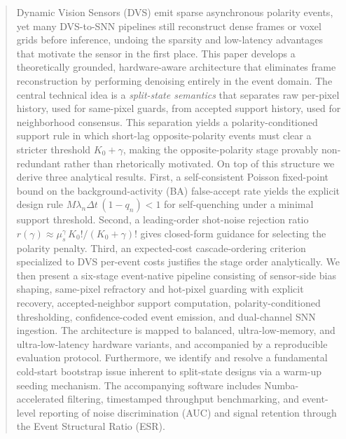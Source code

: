 \documentclass[a4paper,fleqn]{cas-dc}
\begin{document}
\begin{abstract}
Dynamic Vision Sensors (DVS) emit sparse asynchronous polarity events, yet many DVS-to-SNN pipelines still reconstruct dense frames or voxel grids before inference, undoing the sparsity and low-latency advantages that motivate the sensor in the first place. This paper develops a theoretically grounded, hardware-aware architecture that eliminates frame reconstruction by performing denoising entirely in the event domain. The central technical idea is a \emph{split-state semantics} that separates raw per-pixel history, used for same-pixel guards, from accepted support history, used for neighborhood consensus. This separation yields a polarity-conditioned support rule in which short-lag opposite-polarity events must clear a stricter threshold $K_0+\gamma$, making the opposite-polarity stage provably non-redundant rather than rhetorically motivated. On top of this structure we derive three analytical results. First, a self-consistent Poisson fixed-point bound on the background-activity (BA) false-accept rate yields the explicit design rule $M\lambda_n\Delta t\,(1-q_n)<1$ for self-quenching under a minimal support threshold. Second, a leading-order shot-noise rejection ratio $r(\gamma)\approx \mu_s^{\gamma}\,K_0!/(K_0+\gamma)!$ gives closed-form guidance for selecting the polarity penalty. Third, an expected-cost cascade-ordering criterion specialized to DVS per-event costs justifies the stage order analytically. We then present a six-stage event-native pipeline consisting of sensor-side bias shaping, same-pixel refractory and hot-pixel guarding with explicit recovery, accepted-neighbor support computation, polarity-conditioned thresholding, confidence-coded event emission, and dual-channel SNN ingestion. The architecture is mapped to balanced, ultra-low-memory, and ultra-low-latency hardware variants, and accompanied by a reproducible evaluation protocol. Furthermore, we identify and resolve a fundamental cold-start bootstrap issue inherent to split-state designs via a warm-up seeding mechanism. The accompanying software includes Numba-accelerated filtering, timestamped throughput benchmarking, and event-level reporting of noise discrimination (AUC) and signal retention through the Event Structural Ratio (ESR).
\end{abstract}
\end{document}

